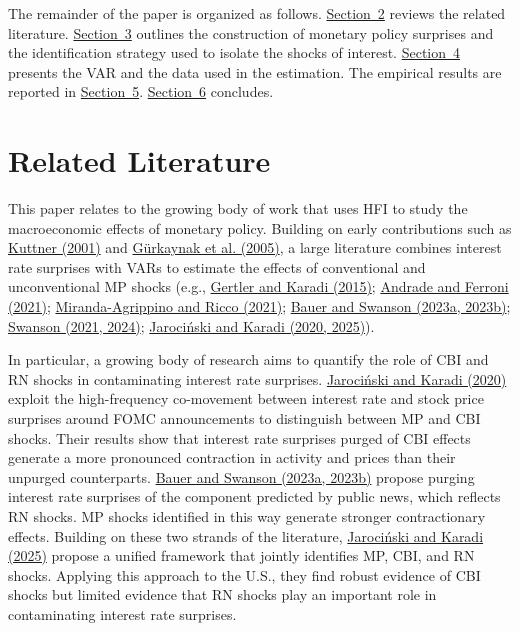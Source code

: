 \documentclass[12pt, reqno]{article}
\begin{document}
The remainder of the paper is organized as follows. \hyperlink{Section 2}{Section~2} reviews the related literature. \hyperlink{Section 3}{Section~3} outlines the construction of monetary policy surprises and the identification strategy used to isolate the shocks of interest. \hyperlink{Section 4}{Section~4} presents the VAR and the data used in the estimation. The empirical results are reported in \hyperlink{Section 5}{Section~5}. \hyperlink{Section 6}{Section~6} concludes.

\section{Related Literature}
\hypertarget{Section 2}{}

This paper relates to the growing body of work that uses HFI to study the macroeconomic effects of monetary policy. Building on early contributions such as \hyperlink{Kuttner (2001)}{Kuttner (2001)} and \hyperlink{Gürkaynak et al. (2005)}{Gürkaynak et al. (2005)}, a large literature combines interest rate surprises with VARs  to estimate the effects of conventional and unconventional MP shocks (e.g., \hyperlink{Gertler and Karadi (2015)}{Gertler and Karadi (2015)};  \hyperlink{Andrade and Ferroni (2021)}{Andrade and Ferroni (2021)}; \hyperlink{Miranda-Agrippino and Ricco (2021)}{Miranda-Agrippino and Ricco (2021)}; \hyperlink{Bauer and Swanson (2023a, 2023b)}{Bauer and Swanson (2023a, 2023b)}; \hyperlink{Swanson (2021, 2024)}{Swanson (2021, 2024)}; \hyperlink{Jarociński and Karadi (2020, 2025)}{Jarociński and Karadi (2020, 2025)}).

In particular, a growing body of research aims to quantify the role of CBI and RN shocks in contaminating interest rate surprises. \hyperlink{Jarociński and Karadi (2020)}{Jarociński and Karadi (2020)} exploit the high-frequency co-movement between interest rate and stock price surprises around FOMC announcements to distinguish between MP and CBI shocks. Their results show that interest rate surprises purged of CBI effects generate a more pronounced contraction in activity and prices than their unpurged counterparts. \hyperlink{Bauer and Swanson (2023a, 2023b)}{Bauer and Swanson (2023a, 2023b)} propose purging interest rate surprises of the component predicted by public news, which reflects RN shocks. MP shocks identified in this way generate stronger contractionary effects. Building on these two strands of the literature, \hyperlink{Jarociński and Karadi (2025)}{Jarociński and Karadi (2025)} propose a unified framework that jointly identifies MP, CBI, and RN shocks. Applying this approach to the U.S., they find robust evidence of CBI shocks but limited evidence that RN shocks play an important role in contaminating interest rate surprises. 
\end{document}

